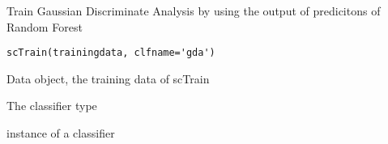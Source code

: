 \documentclass[a4paper]{book}
\begin{document}
%
\begin{Description}\relax
Train Gaussian Discriminate Analysis by using the output of predicitons of Random Forest
\end{Description}
%
\begin{Usage}
\begin{verbatim}
scTrain(trainingdata, clfname='gda')
\end{verbatim}
\end{Usage}
%
\begin{Arguments}
\begin{ldescription}
\item[\code{trainingdata}] Data object, the training data of scTrain
\item[\code{clfname}] The classifier type

\end{ldescription}
\end{Arguments}
%
\begin{Value}
instance of a classifier
\end{Value}
%
\end{document}
